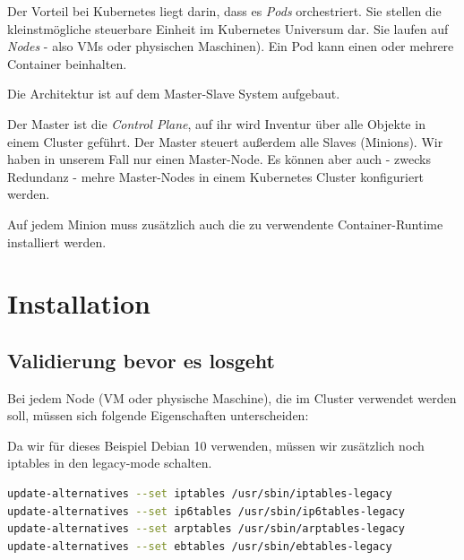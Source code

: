 Der Vorteil bei Kubernetes liegt darin, dass es \emph{Pods}
orchestriert. Sie stellen die kleinstmögliche steuerbare Einheit im
Kubernetes Universum dar. Sie laufen auf \emph{Nodes} - also VMs oder
physischen Maschinen). Ein Pod kann einen oder mehrere Container
beinhalten.

Die Architektur ist auf dem Master-Slave System aufgebaut.

Der Master ist die \emph{Control Plane}, auf ihr wird Inventur über alle
Objekte in einem Cluster geführt. Der Master steuert außerdem alle
Slaves (Minions). Wir haben in unserem Fall nur einen Master-Node. Es
können aber auch - zwecks Redundanz - mehre Master-Nodes in einem
Kubernetes Cluster konfiguriert werden.

Auf jedem Minion muss zusätzlich auch die zu verwendente
Container-Runtime installiert werden.

\hypertarget{installation}{%
\newpage
\section{Installation}\label{installation}}

\hypertarget{validierung-bevor-es-losgeht}{%
\subsection{Validierung bevor es
losgeht}\label{validierung-bevor-es-losgeht}}

Bei jedem Node (VM oder physische Maschine), die im Cluster verwendet
werden soll, müssen sich folgende Eigenschaften unterscheiden:


Da wir für dieses Beispiel Debian 10 verwenden, müssen wir zusätzlich
noch iptables in den legacy-mode schalten.

\begin{lstlisting}[language=Bash]
update-alternatives --set iptables /usr/sbin/iptables-legacy
update-alternatives --set ip6tables /usr/sbin/ip6tables-legacy
update-alternatives --set arptables /usr/sbin/arptables-legacy
update-alternatives --set ebtables /usr/sbin/ebtables-legacy
\end{lstlisting}


